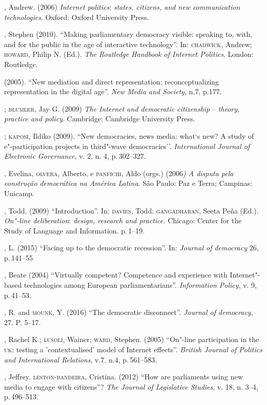 \begin{bibliohedra}
, Andrew. (2006) \emph{Internet politics}: \emph{states,
citizens, and new communication technologies}. Oxford: Oxford University
Press.

, Stephen (2010). ``Making parliamentary democracy visible:
speaking to, with, and for the public in the age of interactive
technology''. In: \textsc{chadwick}, Andrew; \textsc{howard}, Philip N. (Ed.). \emph{The
Routledge Handbook of Internet Politics}. London: Routledge.

\titidem\mbox{} (2005). ``New mediation and direct representation:
reconceptualizing representation in the digital age''. \emph{New Media
and Society}, n.7, p.177.

\titidem; \textsc{blumler}, Jay G. (2009) \emph{The Internet and
democratic citizenship} -- \emph{theory, practice and policy}.
Cambridge: Cambridge University Press.

\titidem; \textsc{kaposi}, Ildiko (2009). ``New democracies, news media:
what`s new? A study of e"-participation projects in third"-wave
democracies''. \emph{International Journal of Electronic Governance}, v.
2, n. 4, p.\,302--327.

, Evelina, \textsc{olvera}, Alberto, e \textsc{panfichi}, Aldo (orgs.) (2006\emph{)
A disputa pela construção democrática na América Latina}. São Paulo: Paz
e Terra; Campinas: Unicamp.

, Todd. (2009) ``Introduction''. In: \textsc{davies}, Todd; \textsc{gangadharan},
Seeta Peña (Ed.). \emph{On"-line deliberation}: \emph{design, research
and practice.} Chicago: Center for the Study of Language and
Information. p.\,1--19.

, L. (2015) ``Facing up to the democratic recession''. In:
\emph{Journal of democracy} 26, p.\,141--55

, Beate (2004) ``Virtually competent? Competence and experience
with Internet"-based technologies among European parliamentarians''.
\emph{Information Policy}, v. 9, p.\,41--53.

, R. and \textsc{mounk}, Y. (2016) ``The democratic disconnect''.
\emph{Journal of democracy}, 27. P. 5--17.

, Rachel K.; \textsc{lusoli}, Wainer; \textsc{ward}, Stephen. (2005) ``On"-line
participation in the \textsc{uk}: testing a 'contextualised' model of Internet
effects''. \emph{British Journal of Politics and International
Relations}, v.7. n.4, p.\,561--583.

, Jeffrey. \textsc{leston}-\textsc{bandeira}, Cristina. (2012) ``How are
parliaments using new media to engage with citizens''? \emph{The Journal
of Legislative Studies}, v. 18, n. 3--4, p.\,496--513.


\end{bibliohedra}
